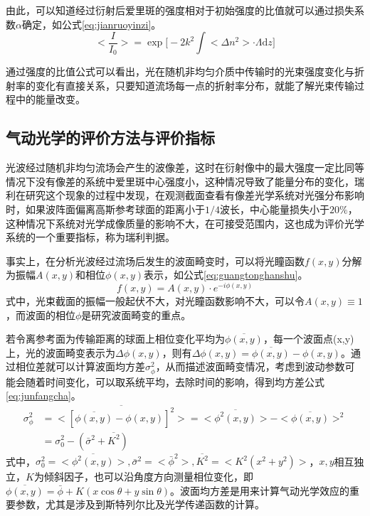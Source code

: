 由此，可以知道经过衍射后爱里斑的强度相对于初始强度的比值就可以通过损失系数$\alpha$确定，如公式\eqref{eq:jianruoyinzi}。
\begin{equation}
<\frac{I}{I_0}>=\exp\Big[-2k^2\int<\Delta n^2>\cdot\Lambda\text{d}z\Big]
\label{eq:jianruoyinzi}
\end{equation}

通过强度的比值公式可以看出，光在随机非均匀介质中传输时的光束强度变化与折射率的变化有直接关系，只要知道流场每一点的折射率分布，就能了解光束传输过程中的能量改变。
\subsection{气动光学的评价方法与评价指标}
光波经过随机非均匀流场会产生的波像差，这时在衍射像中的最大强度一定比同等情况下没有像差的系统中爱里斑中心强度小，这种情况导致了能量分布的变化，瑞利在研究这个现象的过程中发现，在观测截面查看有像差光学系统对光强分布影响时，如果波阵面偏离高斯参考球面的距离小于$1/4$波长，中心能量损失小于$20\%$，这种情况下系统对光学成像质量的影响不大，在可接受范围内，这也成为评价光学系统的一个重要指标，称为瑞利判据。

事实上，在分析光波经过流场后发生的波面畸变时，可以将光瞳函数$f(x,y)$分解为振幅$A(x,y)$和相位$\phi(x,y)$表示，如公式\eqref{eq:guangtonghanshu}。
\begin{equation}
f(x,y)=A(x,y)\cdot e^{-i\phi(x,y)}
\label{eq:guangtonghanshu}
\end{equation}
式中，光束截面的振幅一般起伏不大，对光瞳函数影响不大，可以令$A(x,y)\equiv1$，而波面的相位$\phi$是研究波面畸变的重点。

若令离参考面为传输距离的球面上相位变化平均为$\overline{\phi(x,y)}$，每一个波面点(x,y)上，光的波面畸变表示为$\Delta\phi(x,y)$，则有$\Delta\phi(x,y)=\overline{\phi(x,y)}-\phi(x,y)$。通过相位差就可以计算波面均方差$\sigma_\phi^2$，从而描述波面畸变情况\cite{haris2004}，考虑到波动参数可能会随着时间变化，可以取系统平均，去除时间的影响，得到均方差公式\eqref{eq:junfangcha}。
\begin{equation}
\begin{aligned}
\sigma_\phi^2&=<\overline{[\overline{\phi(x,y)}-\phi(x,y)]^2}>
=<\overline{\phi^2(x,y)}>-<\overline{\phi(x,y)}>^2\\
&=\sigma_0^2-(\bar{\sigma}^2+\overline{K^2})
\end{aligned}
\label{eq:junfangcha}
\end{equation}
式中，$\sigma_0^2=<\overline{\phi^2(x,y)}>,\bar{\sigma}^2=<\bar{\phi}^2>,\overline{K^2}=<K^2(x^2+y^2)>$，$x,y$相互独立，$K$为倾斜因子，也可以沿角度方向测量相位变化，即$\overline{\phi(x,y)}=\bar{\phi}+K(x\cos\theta+y\sin\theta)$。波面均方差是用来计算气动光学效应的重要参数，尤其是涉及到斯特列尔比及光学传递函数的计算。

